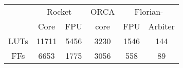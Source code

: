 
\footnotesize

\begin{tabular}{c|cc|c|cc}
&\multicolumn{2}{c|}{Rocket} &ORCA &\multicolumn{2}{c}{Florian-}\\ 
&Core &FPU &core &FPU &Arbiter\\\midrule
LUTs &11711 &5456 &3230 &1546 &144 \\
FFs &6653 &1775 &3056 &558 &89 \\ \midrule
\end{tabular}

